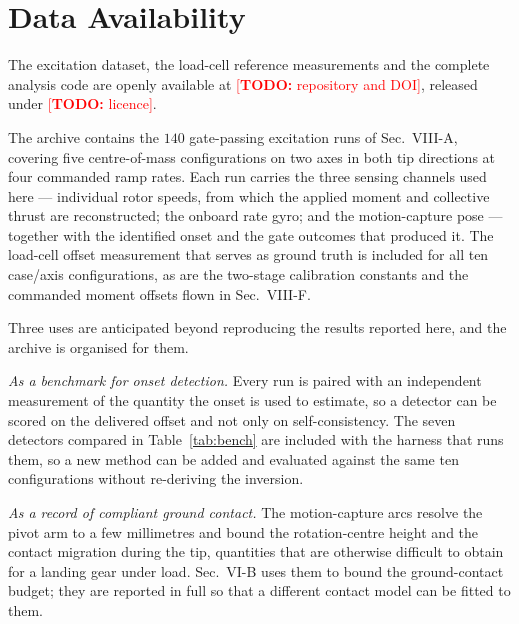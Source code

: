 %

\providecommand{\TODO}[1]{\textcolor{red}{[\textbf{TODO:} #1]}}

\section*{Data Availability}

The excitation dataset, the load-cell reference measurements and the
complete analysis code are openly available at
\TODO{repository and DOI}, released under \TODO{licence}.

The archive contains the $140$ gate-passing excitation runs of
Sec.~VIII-A, covering five centre-of-mass configurations on two axes in
both tip directions at four commanded ramp rates. Each run carries the
three sensing channels used here --- individual rotor speeds, from
which the applied moment and collective thrust are reconstructed; the
onboard rate gyro; and the motion-capture pose --- together with the
identified onset and the gate outcomes that produced it. The load-cell
offset measurement that serves as ground truth is included for all ten
case/axis configurations, as are the two-stage calibration constants
and the commanded moment offsets flown in Sec.~VIII-F.

Three uses are anticipated beyond reproducing the results reported
here, and the archive is organised for them.

\emph{As a benchmark for onset detection.} Every run is paired with an
independent measurement of the quantity the onset is used to estimate,
so a detector can be scored on the delivered offset and not only on
self-consistency. The seven detectors compared in
Table~\ref{tab:bench} are included with the harness that runs them, so
a new method can be added and evaluated against the same ten
configurations without re-deriving the inversion.

\emph{As a record of compliant ground contact.} The motion-capture arcs
resolve the pivot arm to a few millimetres and bound the rotation-centre
height and the contact migration during the tip, quantities that are
otherwise difficult to obtain for a landing gear under load. Sec.~VI-B
uses them to bound the ground-contact budget; they are reported in full
so that a different contact model can be fitted to them.


